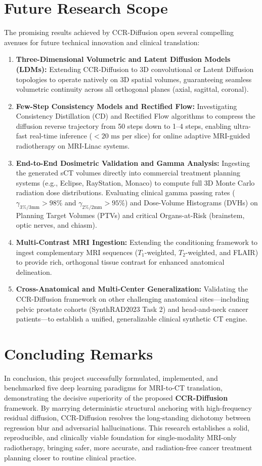 \section{Future Research Scope}
The promising results achieved by CCR-Diffusion open several compelling avenues for future technical innovation and clinical translation:
\begin{enumerate}
    \item \textbf{Three-Dimensional Volumetric and Latent Diffusion Models (LDMs):} Extending CCR-Diffusion to 3D convolutional or Latent Diffusion topologies to operate natively on 3D spatial volumes, guaranteeing seamless volumetric continuity across all orthogonal planes (axial, sagittal, coronal).
    \item \textbf{Few-Step Consistency Models and Rectified Flow:} Investigating Consistency Distillation (CD) and Rectified Flow algorithms to compress the diffusion reverse trajectory from 50 steps down to 1--4 steps, enabling ultra-fast real-time inference ($< 20\text{ ms}$ per slice) for online adaptive MRI-guided radiotherapy on MRI-Linac systems.
    \item \textbf{End-to-End Dosimetric Validation and Gamma Analysis:} Ingesting the generated sCT volumes directly into commercial treatment planning systems (e.g., Eclipse, RayStation, Monaco) to compute full 3D Monte Carlo radiation dose distributions. Evaluating clinical gamma passing rates ($\gamma_{3\%/3\text{mm}} > 98\%$ and $\gamma_{2\%/2\text{mm}} > 95\%$) and Dose-Volume Histograms (DVHs) on Planning Target Volumes (PTVs) and critical Organs-at-Risk (brainstem, optic nerves, and chiasm).
    \item \textbf{Multi-Contrast MRI Ingestion:} Extending the conditioning framework to ingest complementary MRI sequences ($T_1$-weighted, $T_2$-weighted, and FLAIR) to provide rich, orthogonal tissue contrast for enhanced anatomical delineation.
    \item \textbf{Cross-Anatomical and Multi-Center Generalization:} Validating the CCR-Diffusion framework on other challenging anatomical sites—including pelvic prostate cohorts (SynthRAD2023 Task 2) and head-and-neck cancer patients—to establish a unified, generalizable clinical synthetic CT engine.
\end{enumerate}

\section{Concluding Remarks}
In conclusion, this project successfully formulated, implemented, and benchmarked five deep learning paradigms for MRI-to-CT translation, demonstrating the decisive superiority of the proposed \textbf{CCR-Diffusion} framework. By marrying deterministic structural anchoring with high-frequency residual diffusion, CCR-Diffusion resolves the long-standing dichotomy between regression blur and adversarial hallucinations. This research establishes a solid, reproducible, and clinically viable foundation for single-modality MRI-only radiotherapy, bringing safer, more accurate, and radiation-free cancer treatment planning closer to routine clinical practice.
